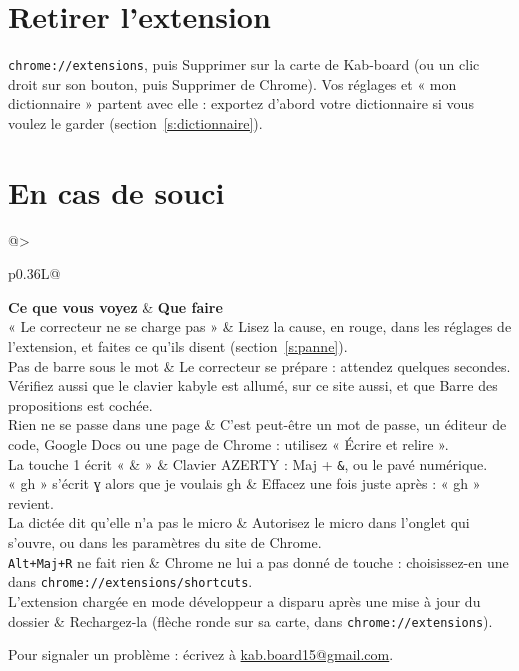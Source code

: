 \documentclass[11pt,a4paper]{article}
\makeatletter
\newcommand{\bouton}[1]{\textsf{#1}}
\newcommand{\touche}[1]{\texttt{#1}}
\newcommand{\chemin}[1]{\texttt{#1}}
\newcommand{\tableau}[3]{%
  \par\noindent\begin{tabularx}{\linewidth}{@{}>{\raggedright\arraybackslash}p{#1}L@{}}
  \toprule #2 \\ \midrule #3 \bottomrule
  \end{tabularx}\par}
\makeatother
\begin{document}
\section{Retirer l'extension}\label{s:retirer}
\chemin{chrome://extensions}, puis \bouton{Supprimer} sur la carte de Kab-board (ou un clic droit sur son bouton, puis \bouton{Supprimer de Chrome}). Vos réglages et « mon dictionnaire » partent avec elle : exportez d'abord votre dictionnaire si vous voulez le garder (section~\ref{s:dictionnaire}).

\section{En cas de souci}\label{s:souci}
\medskip
\tableau{0.36\linewidth}{\textbf{Ce que vous voyez} & \textbf{Que faire}}{%
« Le correcteur ne se charge pas » & Lisez la cause, en rouge, dans les réglages de l'extension, et faites ce qu'ils disent (section~\ref{s:panne}). \\
Pas de barre sous le mot & Le correcteur se prépare : attendez quelques secondes. Vérifiez aussi que le clavier kabyle est allumé, sur ce site aussi, et que \bouton{Barre des propositions} est cochée. \\
Rien ne se passe dans une page & C'est peut-être un mot de passe, un éditeur de code, Google Docs ou une page de Chrome : utilisez « Écrire et relire ». \\
La touche 1 écrit « \& » & Clavier AZERTY : Maj + \touche{\&}, ou le pavé numérique. \\
« gh » s'écrit ɣ alors que je voulais gh & Effacez une fois juste après : « gh » revient. \\
La dictée dit qu'elle n'a pas le micro & Autorisez le micro dans l'onglet qui s'ouvre, ou dans les paramètres du site de Chrome. \\
\touche{Alt+Maj+R} ne fait rien & Chrome ne lui a pas donné de touche : choisissez-en une dans \chemin{chrome://extensions/shortcuts}. \\
L'extension chargée en mode développeur a disparu après une mise à jour du dossier & Rechargez-la (flèche ronde sur sa carte, dans \chemin{chrome://extensions}). \\}

\medskip
Pour signaler un problème : écrivez à \href{mailto:kab.board15@gmail.com}{kab.board15@gmail.com}.
\end{document}
